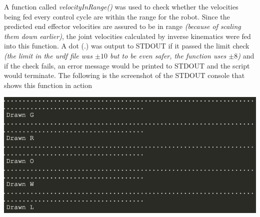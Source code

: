 \documentclass[a4paper]{article}
\begin{document}
A function called {\it velocityInRange()} was used to check whether the velocities being fed every control cycle are within the range for the robot. Since the predicted end effector velocities are assured to be in range {\it (because of scaling them down earlier)}, the joint velocities calculated by inverse kinematics were fed into this function. A dot (.) was output to STDOUT if it passed the limit check {\it (the limit in the urdf file was $\pm 10$ but to be even safer, the function uses $\pm 8$) } and if the check fails, an error message would be printed to STDOUT and the script would terminate. The following is the screenshot of the STDOUT console that shows this function in action\\

\begin{center}
\includegraphics[scale=0.6]{images/4.png}
\end{center}
\end{document}
